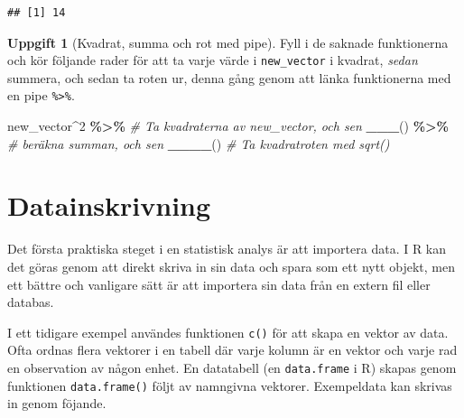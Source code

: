 \documentclass[
]{book}
\newenvironment{Shaded}{\begin{snugshade}}{\end{snugshade}}
\newcommand{\CommentTok}[1]{\textcolor[rgb]{0.56,0.35,0.01}{\textit{#1}}}
\newcommand{\DecValTok}[1]{\textcolor[rgb]{0.00,0.00,0.81}{#1}}
\newcommand{\FunctionTok}[1]{\textcolor[rgb]{0.13,0.29,0.53}{\textbf{#1}}}
\newcommand{\NormalTok}[1]{#1}
\newcommand{\SpecialCharTok}[1]{\textcolor[rgb]{0.81,0.36,0.00}{\textbf{#1}}}
\theoremstyle{definition}
\theoremstyle{definition}
\theoremstyle{definition}
\newtheorem{exercise}{Uppgift}[chapter]
\theoremstyle{definition}
\theoremstyle{remark}
\begin{document}
\begin{verbatim}
## [1] 14
\end{verbatim}

\begin{exercise}[Kvadrat, summa och rot med pipe]

Fyll i de saknade funktionerna och kör följande rader för att ta varje värde i \texttt{new\_vector} i kvadrat, \emph{sedan} summera, och sedan ta roten ur, denna gång genom att länka funktionerna med en pipe \texttt{\%\textgreater{}\%}.

\begin{Shaded}
\begin{Highlighting}[]
\NormalTok{new\_vector}\SpecialCharTok{\^{}}\DecValTok{2} \SpecialCharTok{\%\textgreater{}\%} \CommentTok{\# Ta kvadraterna av new\_vector, och sen}
  \FunctionTok{\_\_\_}\NormalTok{() }\SpecialCharTok{\%\textgreater{}\%}      \CommentTok{\# beräkna summan, och sen}
  \FunctionTok{\_\_\_\_}\NormalTok{()         }\CommentTok{\# Ta kvadratroten med sqrt()}
\end{Highlighting}
\end{Shaded}

\end{exercise}

\section{Datainskrivning}\label{datainskrivning}

Det första praktiska steget i en statistisk analys är att importera data. I R kan det göras genom att direkt skriva in sin data och spara som ett nytt objekt, men ett bättre och vanligare sätt är att importera sin data från en extern fil eller databas.

I ett tidigare exempel användes funktionen \texttt{c()} för att skapa en vektor av data. Ofta ordnas flera vektorer i en tabell där varje kolumn är en vektor och varje rad en observation av någon enhet. En datatabell (en \texttt{data.frame} i R) skapas genom funktionen \texttt{data.frame()} följt av namngivna vektorer. Exempeldata kan skrivas in genom föjande.
\end{document}
